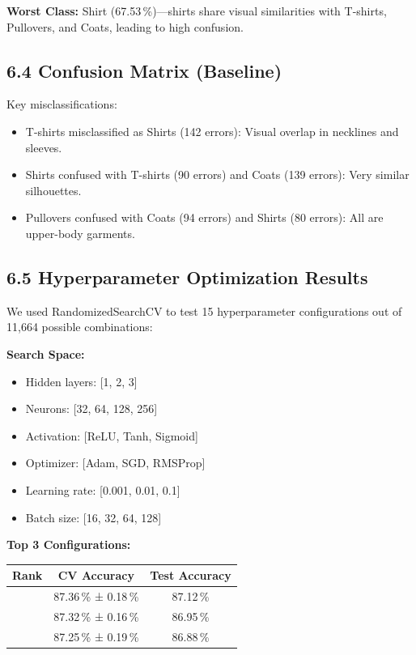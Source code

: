 \documentclass[11pt]{article}
\begin{document}
\textbf{Worst Class:} Shirt (67.53\,\%)—shirts share visual similarities with T-shirts, Pullovers, and Coats, leading to high confusion.

\subsection*{6.4 Confusion Matrix (Baseline)}

Key misclassifications:
\begin{itemize}
\item T-shirts misclassified as Shirts (142 errors): Visual overlap in necklines and sleeves.
\item Shirts confused with T-shirts (90 errors) and Coats (139 errors): Very similar silhouettes.
\item Pullovers confused with Coats (94 errors) and Shirts (80 errors): All are upper-body garments.
\end{itemize}

\subsection*{6.5 Hyperparameter Optimization Results}

We used RandomizedSearchCV to test 15 hyperparameter configurations out of 11,664 possible combinations:

\textbf{Search Space:}
\begin{itemize}
\item Hidden layers: [1, 2, 3]
\item Neurons: [32, 64, 128, 256]
\item Activation: [ReLU, Tanh, Sigmoid]
\item Optimizer: [Adam, SGD, RMSProp]
\item Learning rate: [0.001, 0.01, 0.1]
\item Batch size: [16, 32, 64, 128]
\end{itemize}

\textbf{Top 3 Configurations:}
\begin{center}
\begin{tabular}{|c|c|c|}
\hline
\textbf{Rank} & \textbf{CV Accuracy} & \textbf{Test Accuracy}\\
\hline
#1 & 87.36\,\% ± 0.18\,\% & 87.12\,\%\\
\hline
#2 & 87.32\,\% ± 0.16\,\% & 86.95\,\%\\
\hline
#3 & 87.25\,\% ± 0.19\,\% & 86.88\,\%\\
\hline
\end{tabular}
\end{center}
\end{document}
